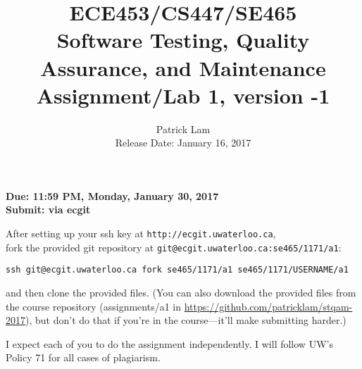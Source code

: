\documentclass[10pt]{article}
\begin{document}
\title{
ECE453/CS447/SE465 \\
Software Testing, Quality Assurance, and Maintenance\\
Assignment/Lab 1, version -1}
\author{Patrick Lam \\
{Release Date:  January 16, 2017} \\
}
\renewcommand{\today}{}
\maketitle

\begin{center}



{\bf Due:  11:59 PM, Monday, January 30, 2017} \\
{\bf Submit: via ecgit }\\
\end{center}




After setting up your ssh key at {\tt http://ecgit.uwaterloo.ca}, \\ fork the provided git repository at {\tt git@ecgit.uwaterloo.ca:se465/1171/a1}:

\begin{center}
{\tt ssh git@ecgit.uwaterloo.ca fork se465/1171/a1 se465/1171/USERNAME/a1}
\end{center}

\noindent and then clone the provided files. 
(You can also download the provided
files from the course repository (assignments/a1 in \url{https://github.com/patricklam/stqam-2017}),
but don't do that if you're in the course---it'll make submitting harder.)

I expect each of you to do the assignment independently. I will follow UW's Policy 71 for all cases of plagiarism.
 
\end{document}
